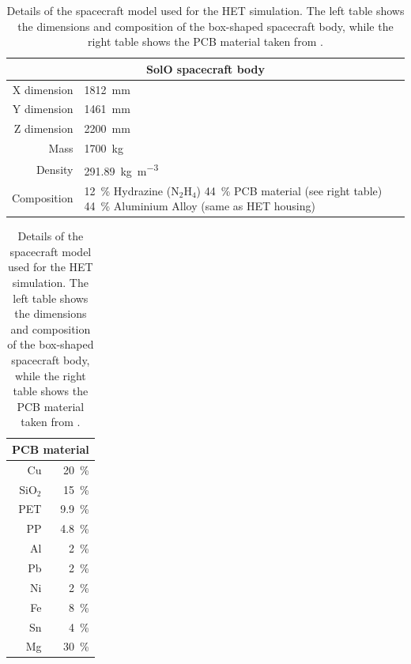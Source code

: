 \begin{table}
    \begin{tabular}{rp{6cm}}
        \toprule
        \multicolumn{2}{c}{\textbf{SolO spacecraft body}}                   \\
        \midrule
        X dimension & \SI{1812}{\milli\meter}                \\
        Y dimension & \SI{1461}{\milli\meter}                \\
        Z dimension & \SI{2200}{\milli\meter}                \\
        Mass        & \SI{1700}{\kilogram}                   \\
        Density     & \SI{291.89}{\kilogram\per\cubic\meter} \\
        Composition & \SI{12}{\percent} Hydrazine (N$_2$H$_4$) \newline \SI{44}{\percent} PCB material (see right table) \newline \SI{44}{\percent} Aluminium Alloy (same as HET housing) \\
        \bottomrule
    \end{tabular}
    \hspace{1cm}
    \begin{tabular}{rr}
    	\toprule
    	\multicolumn{2}{c}{\textbf{PCB material}} \\ \midrule
    	Cu      & \SI{20}{\percent}     \\
    	SiO$_2$ & \SI{15}{\percent}     \\
    	PET     & \SI{9.9}{\percent}    \\
    	PP      & \SI{4.8}{\percent}    \\
    	Al      & \SI{2}{\percent}      \\
    	Pb      & \SI{2}{\percent}      \\
    	Ni      & \SI{2}{\percent}      \\
    	Fe      & \SI{8}{\percent}      \\
    	Sn      & \SI{4}{\percent}      \\
    	Mg      & \SI{30}{\percent}     \\ \bottomrule
    \end{tabular}
    \caption{Details of the spacecraft model used for the HET simulation. The left table shows the dimensions and composition of the box-shaped spacecraft body, while the right table shows the PCB material taken from \citet{Appel-2018,Appel-2018-PhD}.}
    \label{tab:solo_spacecraft_gdml}
\end{table}

